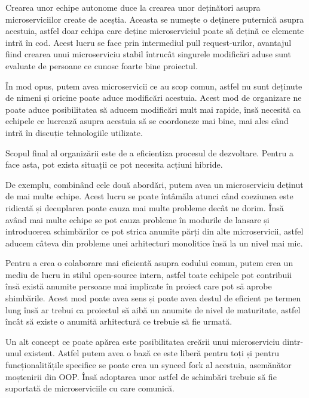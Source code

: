 Crearea unor echipe autonome duce la crearea unor deținători asupra microserviciilor create
de aceștia. Aceasta se numește o deținere puternică asupra acestuia, astfel doar echipa 
care deține microserviciul poate să dețină ce elemente intră în cod. Acest lucru se face
prin intermediul pull request-urilor, avantajul fiind crearea unui microserviciu stabil 
întrucât singurele modificări aduse sunt evaluate de persoane ce cunosc foarte bine proiectul.

În mod opus, putem avea microservicii ce au scop comun, astfel nu sunt deținute de nimeni și 
oricine poate aduce modificări acestuia. Acest mod de organizare ne poate aduce posibilitatea
să aducem modificări mult mai rapide, însă necesită ca echipele ce lucrează asupra acestuia
să se coordoneze mai bine, mai ales când intră în discuție tehnologiile utilizate.

Scopul final al organizării este de a eficientiza procesul de dezvoltare. Pentru a face asta, 
pot exista situații ce pot necesita acțiuni hibride.

De exemplu, combinând cele două abordări, putem avea un microserviciu deținut de mai multe echipe.
Acest lucru se poate întâmăla atunci când coeziunea este ridicată și decuplarea poate cauza
mai multe probleme decât ne dorim. Însă având mai multe echipe se pot cauza probleme în modurile de lansare
și introducerea schimbărilor ce pot strica anumite părți din alte microservicii, astfel 
aducem câteva din probleme unei arhitecturi monolitice însă la un nivel mai mic.

Pentru a crea o colaborare mai eficientă asupra codului comun, putem crea un mediu de lucru in 
stilul open-source intern, astfel toate echipele pot contribuii însă există anumite persoane mai implicate
în proiect care pot să aprobe shimbările. Acest mod poate avea sens și poate avea destul de eficient 
pe termen lung însă ar trebui ca proiectul să aibă un anumite de nivel de maturitate, astfel 
încât să existe o anumită arhitectură ce trebuie să fie urmată.

Un alt concept ce poate apărea este posibilitatea creării unui microserviciu dintr-unul existent.
Astfel putem avea o bază ce este liberă pentru toți și pentru funcționalitățile specifice 
se poate crea un synced fork al acestuia, asemănător moștenirii din OOP. Însă adoptarea unor 
astfel de schimbări trebuie să fie suportată de microserviciile cu care comunică.

